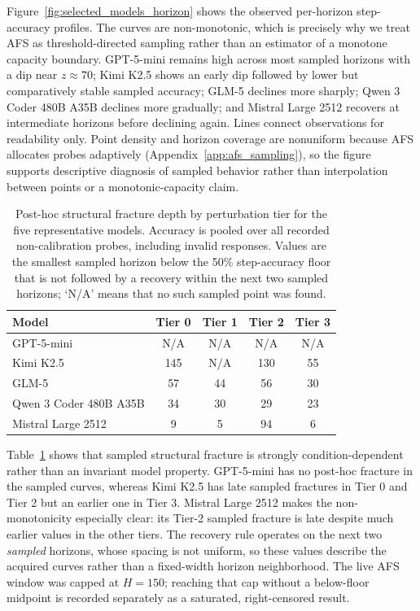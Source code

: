 \documentclass{article}
\begin{document}
Figure~\ref{fig:selected_models_horizon} shows the observed per-horizon step-accuracy profiles. The curves are non-monotonic, which is precisely why we treat AFS as threshold-directed sampling rather than an estimator of a monotone capacity boundary. GPT-5-mini remains high across most sampled horizons with a dip near $z\approx70$; Kimi K2.5 shows an early dip followed by lower but comparatively stable sampled accuracy; GLM-5 declines more sharply; Qwen 3 Coder 480B A35B declines more gradually; and Mistral Large 2512 recovers at intermediate horizons before declining again. Lines connect observations for readability only. Point density and horizon coverage are nonuniform because AFS allocates probes adaptively (Appendix~\ref{app:afs_sampling}), so the figure supports descriptive diagnosis of sampled behavior rather than interpolation between points or a monotonic-capacity claim.

\begin{table}[!ht]
\centering
\caption{Post-hoc structural fracture depth by perturbation tier for the five representative models. Accuracy is pooled over all recorded non-calibration probes, including invalid responses. Values are the smallest sampled horizon below the 50\% step-accuracy floor that is not followed by a recovery within the next two sampled horizons; `N/A' means that no such sampled point was found.}
\label{tab:fracture_selected}
\scriptsize
\begin{tabular}{lcccc}
\toprule
\textbf{Model} & \textbf{Tier 0} & \textbf{Tier 1} & \textbf{Tier 2} & \textbf{Tier 3} \\
\midrule
GPT-5-mini & N/A & N/A & N/A & N/A \\
Kimi K2.5 & 145 & N/A & 130 & 55 \\
GLM-5 & 57 & 44 & 56 & 30 \\
Qwen 3 Coder 480B A35B & 34 & 30 & 29 & 23 \\
Mistral Large 2512 & 9 & 5 & 94 & 6 \\
\bottomrule
\end{tabular}
\end{table}

Table~\ref{tab:fracture_selected} shows that sampled structural fracture is strongly condition-dependent rather than an invariant model property. GPT-5-mini has no post-hoc fracture in the sampled curves, whereas Kimi K2.5 has late sampled fractures in Tier 0 and Tier 2 but an earlier one in Tier 3. Mistral Large 2512 makes the non-monotonicity especially clear: its Tier-2 sampled fracture is late despite much earlier values in the other tiers. The recovery rule operates on the next two \emph{sampled} horizons, whose spacing is not uniform, so these values describe the acquired curves rather than a fixed-width horizon neighborhood. The live AFS window was capped at $H=150$; reaching that cap without a below-floor midpoint is recorded separately as a saturated, right-censored result.
\end{document}
